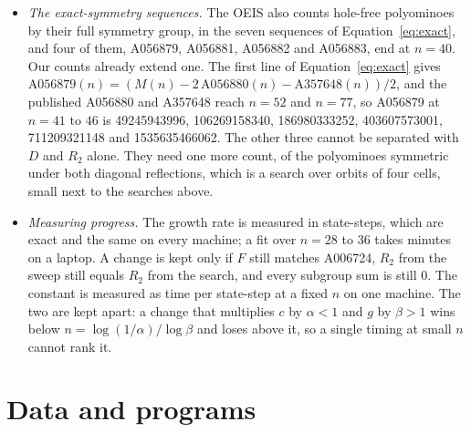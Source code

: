\documentclass[11pt]{a000104}
\numberwithin{equation}{section}
\begin{document}
\begin{itemize}
  \item \emph{The exact-symmetry sequences.} The OEIS also counts hole-free polyominoes by their full symmetry group, in the seven sequences of Equation~\eqref{eq:exact}, and four of them, A056879, A056881, A056882 and A056883, end at $n = 40$. Our counts already extend one. The first line of Equation~\eqref{eq:exact} gives $\text{A056879}(n) = (M(n) - 2\,\text{A056880}(n) - \text{A357648}(n))/2$, and the published A056880 and A357648 reach $n = 52$ and $n = 77$, so A056879 at $n = 41$ to $46$ is 49245943996, 106269158340, 186980333252, 403607573001, 711209321148 and 1535635466062. The other three cannot be separated with $D$ and $R_2$ alone. They need one more count, of the polyominoes symmetric under both diagonal reflections, which is a search over orbits of four cells, small next to the searches above.
  \item \emph{Measuring progress.} The growth rate is measured in state-steps, which are exact and the same on every machine; a fit over $n = 28$ to $36$ takes minutes on a laptop. A change is kept only if $F$ still matches A006724, $R_2$ from the sweep still equals $R_2$ from the search, and every subgroup sum is still $0$. The constant is measured as time per state-step at a fixed $n$ on one machine. The two are kept apart: a change that multiplies $c$ by $\alpha < 1$ and $g$ by $\beta > 1$ wins below $n = \log(1/\alpha) / \log \beta$ and loses above it, so a single timing at small $n$ cannot rank it.
\end{itemize}

\appendix

\section{Data and programs}\label{sec:data}
\end{document}
